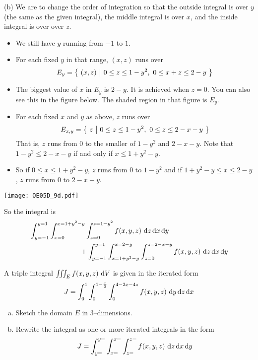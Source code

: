 \begin{solution}
(b) We are to change the order of integration so that the outside 
integral is over $y$ (the same as the given integral),
the middle integral is over $x$, and the inside integral is over
over $z$. 
\begin{itemize}
\item
We still have $y$ running from $-1$ to $1$.
\item
For each fixed $y$ in that range, $(x,z)$ runs over
\begin{equation*}
E_y=\Set{(x,z)}{0\le z\le 1-y^2,\ 0\le x+z\le 2-y}
\end{equation*}
\item 
The biggest value of $x$ in $E_y$ is $2-y$. It is achieved
when $z=0$. You can also see this in the figure below.
The shaded region in that figure is $E_y$.
\item
For each fixed $x$ and $y$ as above,  $z$ runs over
\begin{equation*}
E_{x,y} = \big\{ \ z\ \big|\ 0\le z\le 1-y^2,\ 0\le z\le 2-x-y\ \big\}
\end{equation*}
That is, $z$ runs from $0$ to the smaller of
$1-y^2$ and $2-x-y$. Note that $1-y^2\le 2-x-y$
if and only if $x\le 1+y^2-y$.
\item
So if $0\le x\le 1+y^2-y$, $z$ runs from $0$ to $1-y^2$
and if $1+y^2-y\le x\le 2-y$, $z$ runs from $0$ to $2-x-y$.
\end{itemize}

\begin{center}
     \texttt{[image: OE05D\_9d.pdf]}
\end{center}

So the integral is
\begin{align*}
&\int_{y=-1}^{y=1} \int_{x=0}^{x=1+y^2-y} \int_{z=0}^{z=1-y^2} f(x,y,z)
                                    \ \mathrm{d}z\,\mathrm{d}x\,\mathrm{d}y \\
&\hskip1in
+\int_{y=-1}^{y=1} \int_{x=1+y^2-y}^{x=2-y} \int_{z=0}^{z=2-x-y} f(x,y,z)
                                    \ \mathrm{d}z\,\mathrm{d}x\,\mathrm{d}y
\end{align*}
\end{solution}


\begin{question}[M200 2006D] %
A triple integral $\tripInt_E f(x,y,z)\ \dee{V}$ is given in the 
iterated form
\begin{equation*}
J = \int_0^1 \int_0^{1-\frac{x}{2}} \int_0^{4-2x-4z} f(x,y,z)
                                    \ \dee{y}\,\dee{z}\,\dee{x}
\end{equation*}
\begin{enumerate}[(a)]
\item
Sketch the domain $E$ in 3--dimensions.
\item
Rewrite the integral as one or more iterated integrals in the form
\begin{equation*}
J = \int_{y=}^{y=} \int_{x=}^{x=} \int_{z=}^{z=} f(x,y,z)
                                    \ \dee{z}\,\dee{x}\,\dee{y}
\end{equation*}
\end{enumerate}
\end{question}

